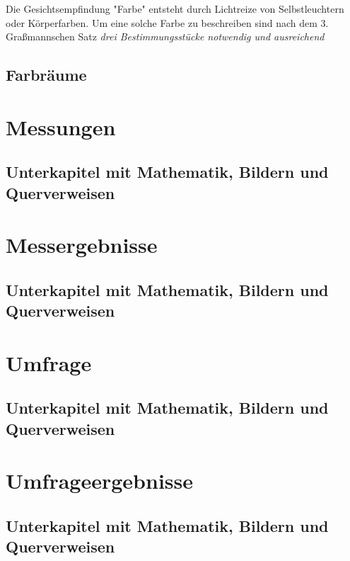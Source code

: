 


Die Gesichtsempfindung "Farbe" entsteht durch Lichtreize von Selbstleuchtern oder Körperfarben. Um eine solche Farbe zu beschreiben sind nach dem 3. Graßmannschen Satz \emph{\glqq drei Bestimmungsstücke notwendig und ausreichend\grqq} \citep[S.102-103]{hentschel}

\section{Farbräume}

\chapter{Messungen}

\section{Unterkapitel mit Mathematik, Bildern und Querverweisen}

\chapter{Messergebnisse}

\section{Unterkapitel mit Mathematik, Bildern und Querverweisen}

\chapter{Umfrage}

\section{Unterkapitel mit Mathematik, Bildern und Querverweisen}

\chapter{Umfrageergebnisse}

\section{Unterkapitel mit Mathematik, Bildern und Querverweisen}

